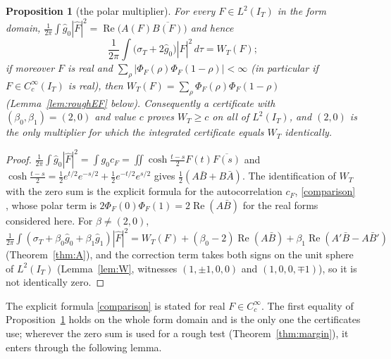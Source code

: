 \documentclass[10pt]{amsart}
\newtheorem{proposition}[theorem]{Proposition}
\theoremstyle{definition}
\theoremstyle{remark}
\newcommand{\Rel}{\operatorname{Re}}
\newcommand{\IT}{I_T}
\newcommand{\sT}{\sigma_T}
\newcommand{\gh}[1]{\widehat g_{#1}}
\newcommand{\Fh}{\widehat F}
\newcommand{\cF}{c_F}
\begin{document}
\begin{proposition}[the polar multiplier]\label{prop:P}
For every $F\in L^2(\IT)$ in the form domain,
$\frac1{2\pi}\int\gh0|\Fh|^2=\Rel\big(A(F)\overline{B(F)}\big)$ and hence
\[
\frac1{2\pi}\int\big(\sT+2\gh0\big)|\Fh|^2\,d\tau=W_T(F);
\]
if moreover $F$ is real and $\sum_\rho|\Phi_F(\rho)\Phi_F(1-\rho)|<\infty$ (in particular if
$F\in C_c^\infty(\IT)$ is real), then $W_T(F)=\sum_\rho\Phi_F(\rho)\Phi_F(1-\rho)$
(Lemma~\ref{lem:roughEF} below).
Consequently a certificate with $(\beta_0,\beta_1)=(2,0)$ and value $c$ proves $W_T\ge c$ on all
of $L^2(\IT)$, and $(2,0)$ is the only multiplier for which the integrated certificate equals $W_T$ identically.
\end{proposition}
\begin{proof}
$\frac1{2\pi}\int\gh0|\Fh|^2=\int g_0\cF=\iint\cosh\frac{t-s}2F(t)\overline{F(s)}$ and
$\cosh\frac{t-s}2=\frac12e^{t/2}e^{-s/2}+\frac12e^{-t/2}e^{s/2}$ gives $\frac12(A\bar B+B\bar A)$.
The identification of $W_T$ with the zero sum is the explicit formula for the autocorrelation
$\cF$, \eqref{comparison} \cite{Weil52,Bombieri2000}, whose polar term is
$2\Phi_F(0)\Phi_F(1)=2\Rel(A\bar B)$ for the real forms considered here. For $\beta\ne(2,0)$,
$\frac1{2\pi}\int(\sT+\beta_0\gh0+\beta_1\gh1)|\Fh|^2=W_T(F)+(\beta_0-2)\Rel(A\bar B)+\beta_1\Rel(A'\bar B-A\bar B')$
(Theorem~\ref{thm:A}), and the correction term takes both signs on the unit sphere of $L^2(\IT)$
(Lemma~\ref{lem:W}, witnesses $(1,\pm1,0,0)$ and $(1,0,0,\mp1)$), so it is not identically zero.
\end{proof}

The explicit formula \eqref{comparison} is stated for real $F\in C_c^\infty$. The first equality of
Proposition~\ref{prop:P} holds on the whole form domain and is the only one the certificates use;
wherever the zero sum is used for a rough test (Theorem~\ref{thm:margin}), it enters through the
following lemma.
\end{document}
